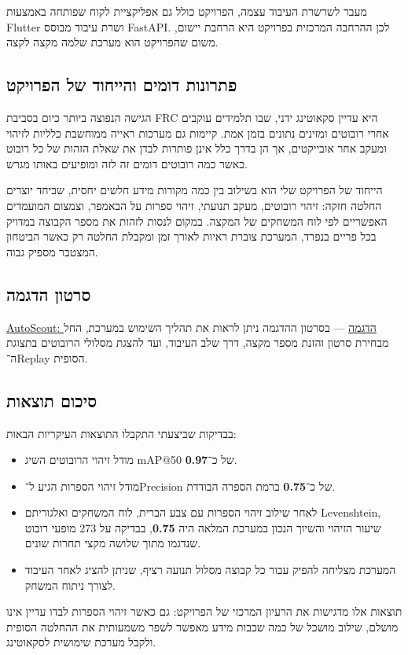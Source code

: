 מעבר לשרשרת העיבוד עצמה, הפרויקט כולל גם אפליקציית לקוח שפותחה באמצעות
\textenglish{Flutter} ושרת עיבוד מבוסס \textenglish{FastAPI}. לכן
ההרחבה המרכזית בפרויקט היא הרחבת יישום, משום שהפרויקט הוא מערכת שלמה
מקצה לקצה.

\subsection{פתרונות דומים והייחוד של הפרויקט}

הגישה הנפוצה ביותר כיום בסביבת \textenglish{FRC} היא עדיין סקאוטינג
ידני, שבו תלמידים עוקבים אחרי רובוטים ומזינים נתונים בזמן אמת. קיימות
גם מערכות ראייה ממוחשבת כלליות לזיהוי ומעקב אחר אובייקטים, אך הן בדרך
כלל אינן פותרות לבדן את שאלת הזהות של כל רובוט כאשר כמה רובוטים דומים
זה לזה ומופיעים באותו מגרש.

הייחוד של הפרויקט שלי הוא בשילוב בין כמה מקורות מידע חלשים יחסית,
שביחד יוצרים החלטה חזקה: זיהוי רובוטים, מעקב תנועתי, זיהוי ספרות על
הבאמפר, וצמצום המועמדים האפשריים לפי לוח המשחקים של המקצה. במקום לנסות
לזהות את מספר הקבוצה במדויק בכל פריים בנפרד, המערכת צוברת ראיות לאורך
זמן ומקבלת החלטה רק כאשר הביטחון המצטבר מספיק גבוה.

\subsection{סרטון הדגמה}
\href{https://www.youtube.com/watch?v=x60OrcgcYnA}{\textenglish{AutoScout}:
  הדגמה} --- בסרטון ההדגמה ניתן לראות את תהליך השימוש במערכת, החל
מבחירת סרטון והזנת מספר מקצה, דרך שלב העיבוד, ועד להצגת מסלולי
הרובוטים בתצוגת ה־\textenglish{Replay} הסופית.

\subsection{סיכום תוצאות}

בבדיקות שביצעתי התקבלו התוצאות העיקריות הבאות:
\begin{itemize}
\item מודל זיהוי הרובוטים השיג \textenglish{mAP@50} של
  כ־\textbf{0.97}.
\item מודל זיהוי הספרות הגיע ל־\textenglish{Precision} של
  כ־\textbf{0.75} ברמת הספרה הבודדת.
\item לאחר שילוב זיהוי הספרות עם צבע הברית, לוח המשחקים ואלגוריתם
  \textenglish{Levenshtein}, שיעור הזיהוי והשיוך הנכון במערכת המלאה
  היה \textbf{0.75}, בבדיקה על 273 מופעי רובוט שנדגמו מתוך שלושה מקצי
  תחרות שונים.
\item המערכת מצליחה להפיק עבור כל קבוצה מסלול תנועה רציף, שניתן להציג
  לאחר העיבוד לצורך ניתוח המשחק.
\end{itemize}

תוצאות אלו מדגישות את הרעיון המרכזי של הפרויקט: גם כאשר זיהוי
הספרות לבדו עדיין אינו מושלם, שילוב מושכל של כמה שכבות מידע מאפשר לשפר
משמעותית את ההחלטה הסופית ולקבל מערכת שימושית לסקאוטינג.
